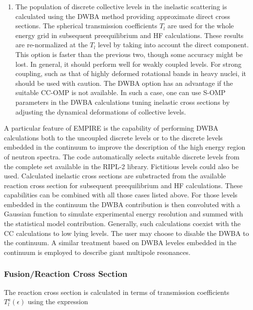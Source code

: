 \begin{enumerate}
\item The population of discrete collective levels in the inelastic
scattering is calculated using the DWBA method providing approximate direct
cross sections. The spherical transmission coefficients $T_{l}$ are used for
the whole energy grid in subsequent preequilibrium and HF calculations.
These results are re-normalized at the $T_{l}$ level by taking into account
the direct component. This option is faster than the previous two, though
some accuracy might be lost. In general, it should perform well for weakly
coupled levels. For strong coupling, such as that of highly deformed
rotational bands in heavy nuclei, it should be used with caution. The DWBA
option has an advantage if the suitable CC-OMP is not available. In such a
case, one can use S-OMP parameters in the DWBA calculations tuning inelastic
cross sections by adjusting the dynamical deformations of collective levels.
\end{enumerate}

\bigskip

A particular feature of EMPIRE is the capability of performing DWBA
calculations both to the uncoupled discrete levels or to the discrete levels
embedded in the continuum to improve the description of the high energy
region of neutron spectra. The code automatically selects suitable discrete
levels from the complete set available in the RIPL-2 library. Fictitious
levels could also be used. Calculated inelastic cross sections are
substracted from the available reaction cross section for subsequent
preequilibrium and HF calculations. These capabilities can be combined with
all those cases listed above. For those levels embedded in the continuum the
DWBA contribution is then convoluted with a Gaussian function to simulate
experimental energy resolution and summed with the statistical model
contribution. Generally, such calculations coexist with the CC calculations
to low lying levels. The user may choose to disable the DWBA to the
continuum. A similar treatment based on DWBA leveles embedded in the
continuum is employed to describe giant multipole resonances.

\subsubsection{Fusion/Reaction Cross Section\label{sec:fusion}}

The reaction cross section is calculated in terms of transmission
coefficients $T_{l}^{a}(\epsilon)$ using the expression

